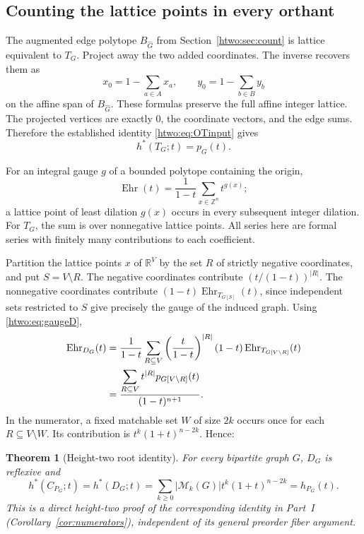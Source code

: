 \documentclass[11pt]{article}
\numberwithin{equation}{section}
\newtheorem{theorem}{Theorem}[section]
\theoremstyle{definition}
\newcommand{\R}{\mathbb R}
\newcommand{\Z}{\mathbb Z}
\newcommand{\Ehr}{\operatorname{Ehr}}
\newcommand{\PM}{\mathcal M}
\begin{document}
\subsection{Counting the lattice points in every orthant}

The augmented edge polytope $B_{\widehat G}$ from
Section~\ref{htwo:sec:count} is lattice equivalent to $T_G$. Project away the
two added coordinates. The inverse recovers them as
\[
 x_0=1-\sum_{a\in A}x_a,\qquad y_0=1-\sum_{b\in B}y_b
\]
on the affine span of $B_{\widehat G}$. These formulas preserve the full
affine integer lattice. The projected vertices are exactly
$0$, the coordinate vectors, and the edge sums. Therefore the established
identity \eqref{htwo:eq:OTinput} gives
\begin{equation}
 h^*(T_G;t)=p_G(t).
 \label{htwo:eq:hstarT}
\end{equation}

For an integral gauge $g$ of a bounded polytope containing the origin,
\[
 \Ehr(t)=\frac1{1-t}\sum_{x\in\Z^n}t^{g(x)};
\]
a lattice point of least dilation $g(x)$ occurs in every subsequent
integer dilation. For $T_G$, the sum is over nonnegative lattice points.
All series here are formal series with finitely many contributions to
each coefficient.

Partition the lattice points $x$ of $\R^V$ by the set $R$ of strictly
negative coordinates, and put $S=V\setminus R$. The negative coordinates
contribute $(t/(1-t))^{|R|}$. The nonnegative coordinates contribute
$(1-t)\Ehr_{T_{G[S]}}(t)$, since independent sets restricted to $S$
give precisely the gauge of the induced graph. Using \eqref{htwo:eq:gaugeD},
\begin{align}
 \Ehr_{D_G}(t)
 &=\frac1{1-t}\sum_{R\subseteq V}
       \left(\frac{t}{1-t}\right)^{|R|}
       (1-t)\Ehr_{T_{G[V\setminus R]}}(t)\notag\\
 &=\frac{\displaystyle\sum_{R\subseteq V}t^{|R|}
                       p_{G[V\setminus R]}(t)}{(1-t)^{n+1}}.
 \label{htwo:eq:orthantEhr}
\end{align}
In the numerator, a fixed matchable set $W$ of size $2k$ occurs once for
each $R\subseteq V\setminus W$. Its contribution is
$t^k(1+t)^{n-2k}$. Hence:

\begin{theorem}[Height-two root identity]\label{htwo:thm:rootidentity}
For every bipartite graph $G$, $D_G$ is reflexive and
\begin{equation}
 h^*(C_{P_G};t)=h^*(D_G;t)
 =\sum_{k\ge0}|\PM_k(G)|t^k(1+t)^{n-2k}=h_{P_G}(t).
 \label{htwo:eq:rootidentity}
\end{equation}
This is a direct height-two proof of the corresponding identity in
Part~I (Corollary~\ref{cor:numerators}), independent of its general
preorder fiber argument.
\end{theorem}
\end{document}
